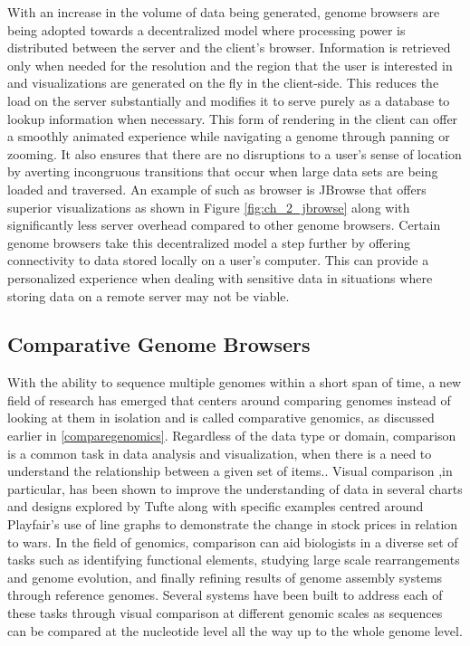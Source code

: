 With an increase in the volume of data being generated, genome browsers are being adopted towards a decentralized model where processing power is distributed between the server and the client's browser. Information is retrieved only when needed for the resolution and the region that the user is interested in and visualizations are generated on the fly in the client-side. This reduces the load on the server substantially and modifies it to serve purely as a database to lookup information when necessary. This form of rendering in the client can offer a smoothly animated experience while navigating a genome through panning or zooming. It also ensures that there are no disruptions to a user's sense of location by averting incongruous transitions that occur when large data sets are being loaded and traversed. An example of such as browser is JBrowse that offers superior visualizations as shown in Figure \ref{fig:ch_2_jbrowse} along with significantly less server overhead compared to other genome browsers\cite{skinner2009jbrowse}.
Certain genome browsers take this decentralized model a step further by offering connectivity to data stored locally on a user's computer\cite{ucscgenome,saito2009utgb}. This can provide a personalized experience when dealing with sensitive data in situations where storing data on a remote server may not be viable. 



\subsection{Comparative Genome Browsers}
With the ability to sequence multiple genomes within a short span of time, a new field of research has emerged that centers around comparing genomes instead of looking at them in isolation and is called comparative genomics, as discussed earlier in \ref{comparegenomics}. Regardless of the data type or domain, comparison is a common task in data analysis and visualization, when there is a need to understand the relationship between a given set of items.\cite{gleicher2017considerations}. Visual comparison ,in particular, has been shown to improve the understanding of data in several charts and designs explored by Tufte\cite{tufte1990envisioning} along with specific examples centred around Playfair's use of line graphs to demonstrate the change in stock prices in relation to wars\cite{costigan1990william}. In the field of genomics, comparison can aid biologists in a diverse set of tasks such as identifying functional elements, studying large scale rearrangements and genome evolution, and finally refining results of genome assembly systems through reference genomes\cite{nielsen2010visualizing}. Several systems have been built to address each of these tasks through visual comparison at different genomic scales as sequences can be compared at the nucleotide level all the way up to the whole genome level.


